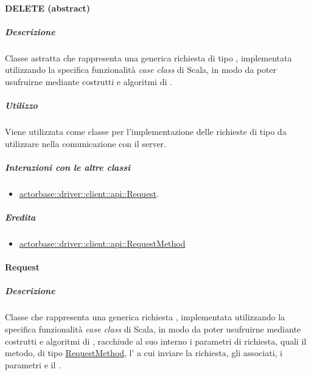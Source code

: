 \documentclass{scalatekids-article}
\begin{document}

\paragraph{DELETE (abstract)}
\label{sec:actorbase::driver::client::api::DELETE}

\subparagraph{Descrizione}

Classe astratta che rappresenta una generica richiesta  di tipo
, implementata utilizzando la specifica funzionalità \textit{case
  class} di Scala, in modo da poter usufruirne mediante costrutti e algoritmi di
.

\subparagraph{Utilizzo}

Viene utilizzata come classe per l'implementazione delle richieste 
di tipo  da utilizzare nella comunicazione con il server.

\subparagraph{Interazioni con le altre classi}

\begin{itemize}
\item \hyperref[sec:actorbase::driver::client::api::Request]{actorbase::driver::client::api::Request}.
\end{itemize}

\subparagraph{Eredita}

\begin{itemize}
\item \hyperref[sec:actorbase::driver::client::api::RequestMethod]{actorbase::driver::client::api::RequestMethod}
\end{itemize}


\paragraph{Request}
\label{sec:actorbase::driver::client::api::Request}

\subparagraph{Descrizione}

Classe che rappresenta una generica richiesta , implementata
utilizzando la specifica funzionalità \textit{case class} di Scala, in modo da
poter usufruirne mediante costrutti e algoritmi di ,
racchiude al suo interno i parametri di richiesta, quali il metodo, di tipo
\hyperref[sec:actorbase::driver::client::api::RequestMethod]{RequestMethod},
l' a cui inviare la richiesta, gli  
associati, i parametri e il .
\end{document}
